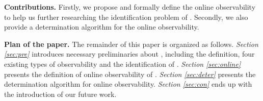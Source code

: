 \medskip\noindent
{\bf Contributions.}
Firstly, we propose and formally define the online observability to help us further researching the identification problem of \BCNs. %
Secondly, we also provide a determination algorithm for the online observability. %

\medskip\noindent
{\bf Plan of the paper.}
The remainder of this paper is organized as follows.
 {\em Section \ref{sec:pre}} introduces necessary preliminaries about \BCNs, including the definition, four existing types of observability and the identification of \BCNs. {\em Section \ref{sec:online}} presents the definition of online observability of \BCNs. {\em Section \ref{sec:deter}} presents the determination algorithm for online observability. 
 {\em Section \ref{sec:con}} ends up with the introduction of our future work.

